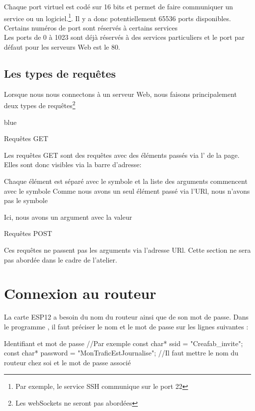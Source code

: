 Chaque port virtuel est codé sur 16 bits et permet de faire communiquer un service
ou un logiciel.\footnote{Par exemple, le service SSH communique sur le port 22}. Il y a donc potentiellement
65536 ports disponibles. Certains numéros de port sont réservés à certains services \\
Les ports de 0 à 1023 sont déjà réservés à des services particuliers et le port par défaut pour les serveurs Web est le 80.

\subsection{Les types de requêtes}

Lorsque nous nous connectons à un serveur Web, nous faisons principalement deux types de requêtes\footnote{Les webSockets ne 
seront pas abordées}
\begin{items}{blue}{\Triangle}
\item Requêtes GET

Les requêtes GET sont des requêtes avec des éléments passés via l' de la page.
Elles sont donc visibles via la barre d'adresse: 


Chaque élément est séparé avec le symbole  et la liste des arguments commencent avec le symbole  
Comme nous avons un seul élément passé via l'URl, nous n'avons pas le symbole 

Ici, nous avons un argument  avec la valeur 

\item Requêtes POST

Ces requêtes ne passent pas les arguments via l'adresse URl. Cette section ne sera pas abordée dans le cadre de l'atelier.
\end{items}

\section{Connexion au routeur}

La carte ESP12 a besoin du nom du routeur ainsi que de son mot de passe. 
Dans le programme , il faut préciser le nom et le mot de passe sur les lignes suivantes : 

\begin{Cpp}{Identifiant et mot de passe}
//Par exemple
const char* ssid     = "Creafab_invite";
const char* password = "MonTraficEstJournalise";
//Il faut mettre le nom du routeur chez soi et le mot de passe associé
\end{Cpp}



